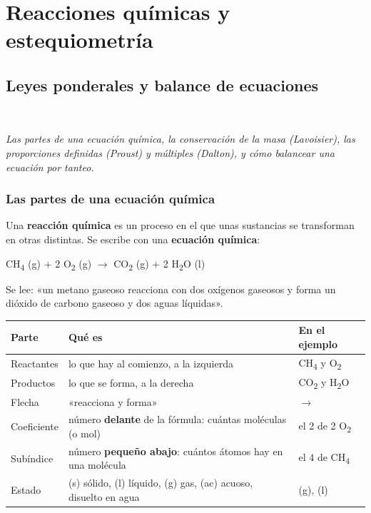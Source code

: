 \chapter{Reacciones químicas y estequiometría}
\section[Leyes ponderales y balance de ecuaciones]{Leyes ponderales y balance de ecuaciones}
\modcomun\ \ {\color{gris}\itshape Las partes de una ecuación química, la conservación de la masa (Lavoisier), las proporciones definidas (Proust) y múltiples (Dalton), y cómo balancear una ecuación por tanteo.\par}
\subsection{Las partes de una ecuación química}
Una \textbf{reacción química} es un proceso en el que unas sustancias se transforman en otras distintas. Se escribe con una \textbf{ecuación química}:

 
\begin{center}
CH\textsubscript{4} (g) + 2 O\textsubscript{2} (g) \ensuremath{\rightarrow} CO\textsubscript{2} (g) + 2 H\textsubscript{2}O (l)
\end{center}
 

Se lee: «un metano gaseoso reacciona con dos oxígenos gaseosos y forma un dióxido de carbono gaseoso y dos aguas líquidas».

 
\begin{center}\small
\begin{tabularx}{\linewidth}{@{}>{\raggedright\arraybackslash\hsize=0.63\hsize}X>{\raggedright\arraybackslash\hsize=1.79\hsize}X>{\raggedright\arraybackslash\hsize=0.58\hsize}X@{}}
\toprule
\textbf{Parte} & \textbf{Qué es} & \textbf{En el ejemplo} \\
\midrule
Reactantes & lo que hay al comienzo, a la izquierda & CH\textsubscript{4} y O\textsubscript{2} \\
Productos & lo que se forma, a la derecha & CO\textsubscript{2} y H\textsubscript{2}O \\
Flecha & «reacciona y forma» & \ensuremath{\rightarrow} \\
Coeficiente & número \textbf{delante} de la fórmula: cuántas moléculas (o mol) & el 2 de 2 O\textsubscript{2} \\
Subíndice & número \textbf{pequeño abajo}: cuántos átomos hay en una molécula & el 4 de CH\textsubscript{4} \\
Estado & (s) sólido, (l) líquido, (g) gas, (ac) acuoso, disuelto en agua & (g), (l) \\
\bottomrule
\end{tabularx}
\end{center}
  
